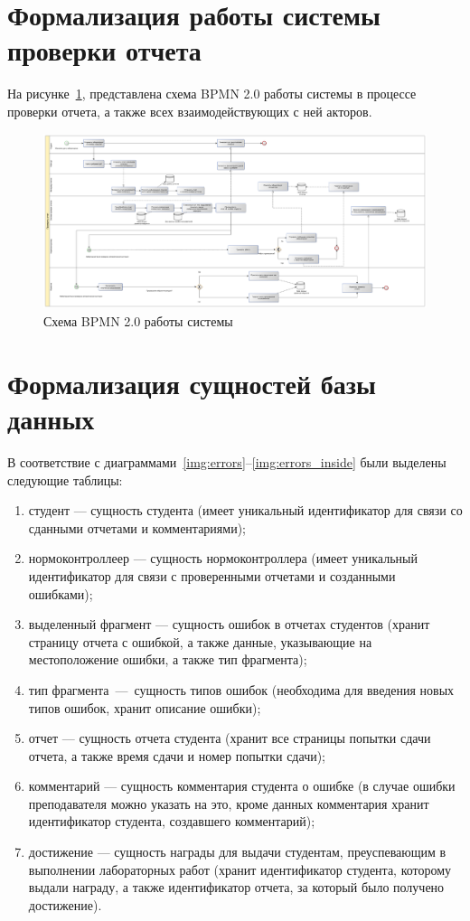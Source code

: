 \section{Формализация работы системы проверки отчета}
На рисунке~\ref{img:main_sys_bpmn}, представлена схема BPMN 2.0 работы системы в процессе проверки отчета, а также всех взаимодействующих с ней акторов.
\pagebreak
\begin{figure}
	\centering
	\includegraphics[width=\textwidth]{./inc/img/process_check_bpmn.pdf}
	\caption{Схема BPMN 2.0 работы системы}
	\label{img:main_sys_bpmn}
\end{figure}


\section{Формализация сущностей базы данных}

В соответствие с диаграммами~\ref{img:errors}--\ref{img:errors_inside} были выделены следующие таблицы:
\begin{enumerate}
	\item студент --- сущность студента (имеет уникальный идентификатор для связи со сданными отчетами и комментариями);
	\item нормоконтроллеер --- сущность нормоконтроллера (имеет уникальный идентификатор для связи с проверенными отчетами и созданными ошибками);
	\item выделенный фрагмент --- сущность ошибок в отчетах студентов (хранит страницу отчета с ошибкой, а также данные, указывающие на местоположение ошибки, а также тип фрагмента);
	\item тип фрагмента~---~сущность типов ошибок (необходима для введения новых типов ошибок, хранит описание ошибки);
	\item отчет --- сущность отчета студента (хранит все страницы попытки сдачи отчета, а также время сдачи и номер попытки сдачи);
	\item комментарий --- сущность комментария студента о ошибке (в случае ошибки преподавателя можно указать на это, кроме данных комментария хранит идентификатор студента, создавшего комментарий);
	\item достижение --- сущность награды для выдачи студентам, преуспевающим в выполнении лабораторных работ (хранит идентификатор студента, которому выдали награду, а также идентификатор отчета, за который было получено достижение).
\end{enumerate}

